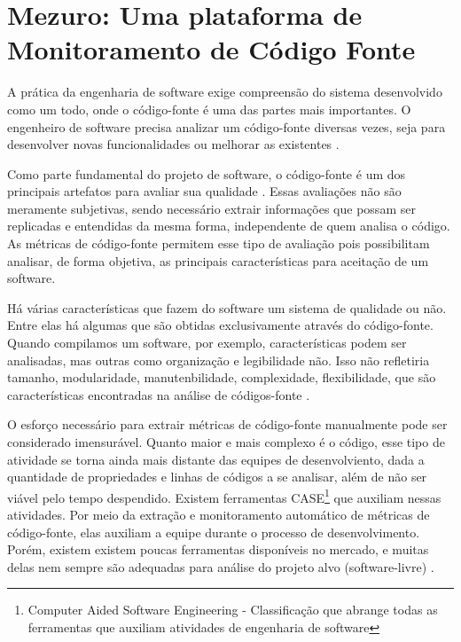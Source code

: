 \chapter{Mezuro: Uma plataforma de Monitoramento de Código Fonte}

A prática da engenharia de software exige compreensão do sistema desenvolvido como um todo, onde o código-fonte é uma das partes mais importantes. O engenheiro de software precisa analizar um código-fonte diversas vezes, seja para desenvolver novas funcionalidades ou melhorar as existentes \cite{meirelles2010mezuro}.

Como parte fundamental do projeto de software, o código-fonte é um dos principais artefatos para avaliar sua qualidade \cite{meirelles2009crab}. Essas avaliações não são meramente subjetivas, sendo necessário extrair informações que possam ser replicadas e entendidas da mesma forma, independente de quem analisa o código. As métricas de código-fonte permitem esse tipo de avaliação pois possibilitam analisar, de forma objetiva, as principais características para aceitação de um software.

Há várias características que fazem do software um sistema de qualidade ou não. Entre elas há algumas que são obtidas exclusivamente através do código-fonte. Quando compilamos um software, por exemplo, características podem ser analisadas, mas outras como organização e legibilidade não. Isso não refletiria tamanho, modularidade, manutenbilidade, complexidade, flexibilidade, que são características encontradas na análise de códigos-fonte \cite{meirelles2013metrics}.

O esforço necessário para extrair métricas de código-fonte manualmente pode ser considerado imensurável. Quanto maior e mais complexo é o código, esse tipo de atividade se torna ainda mais distante das equipes de desenvolviento, dada a quantidade de propriedades e linhas de códigos a se analisar, além de não ser viável pelo tempo despendido. 
Existem ferramentas CASE\footnote{Computer Aided Software Engineering - Classificação que abrange todas as ferramentas que auxiliam atividades de engenharia de software } que auxiliam nessas atividades. Por meio da extração e monitoramento automático de métricas de código-fonte, elas auxiliam  a equipe durante o processo de desenvolvimento. Porém, existem existem poucas ferramentas disponíveis no mercado, e muitas delas nem sempre são adequadas para análise do projeto alvo (software-livre) \cite{meirelles2010mezuro}.

